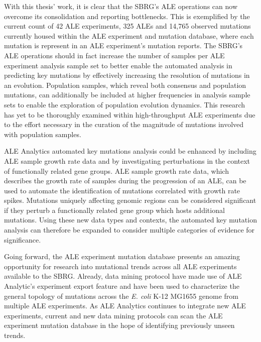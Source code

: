 \documentclass[12pt,final,masters,chapterheads]{ucsd}  %
\begin{document}
With this thesis' work, it is clear that the SBRG's ALE operations can now overcome its consolidation and reporting bottlenecks. This is exemplified by the current count of 42 ALE experiments, 325 ALEs and 14,765 observed mutations currently housed within the ALE experiment and mutation database, where each mutation is represent in an ALE experiment's mutation reports. The SBRG's ALE operations should in fact increase the number of samples per ALE experiment analysis sample set to better enable the automated analysis in predicting key mutations by effectively increasing the resolution of mutations in an evolution. Population samples, which reveal both consensus and population mutations, can additionally be included at higher frequencies in analysis sample sets to enable the exploration of population evolution dynamics. This research has yet to be thoroughly examined within high-throughput ALE experiments due to the effort necessary in the curation of the magnitude of mutations involved with population samples.

ALE Analytics automated key mutations analysis could be enhanced by including ALE sample growth rate data and by investigating perturbations in the context of functionally related gene groups. ALE sample growth rate data, which describes the growth rate of samples during the progression of an ALE, can be used to automate the identification of mutations correlated with growth rate spikes. Mutations uniquely affecting genomic regions can be considered significant if they perturb a functionally related gene group which hosts additional mutations. Using these new data types and contexts, the automated key mutation analysis can therefore be expanded to consider multiple categories of evidence for significance.

Going forward, the ALE experiment mutation database presents an amazing opportunity for research into mutational trends across all ALE experiments available to the SBRG. Already, data mining protocol have made use of ALE Analytic's experiment export feature and have been used to characterize the general topology of mutations across the \textit{E. coli} K-12 MG1655 genome from multiple ALE experiments. As ALE Analytics continues to integrate new ALE experiments, current and new data mining protocols can scan the ALE experiment mutation database in the hope of identifying previously unseen trends.

\appendix

\end{document}
